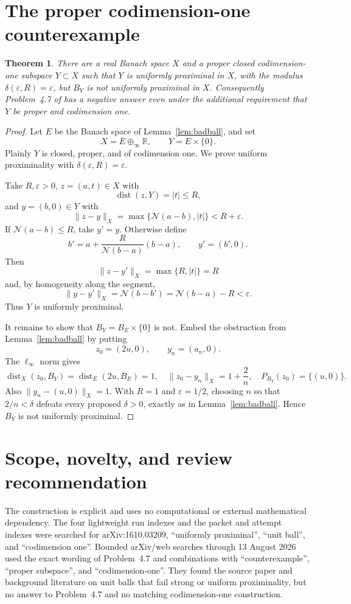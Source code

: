 \documentclass[11pt,a4paper]{article}
\newtheorem{theorem}{Theorem}
\newcommand{\R}{\mathbb R}
\newcommand{\N}{\mathcal N}
\newcommand{\dist}{\operatorname{dist}}
\begin{document}
\section{The proper codimension-one counterexample}

\begin{theorem}\label{thm:main}
There are a real Banach space $X$ and a proper closed codimension-one subspace
$Y\subset X$ such that $Y$ is uniformly proximinal in $X$, with the modulus
$\delta(\varepsilon,R)=\varepsilon$, but $B_Y$ is not uniformly proximinal
in $X$. Consequently Problem~4.7 of \cite{Paul} has a negative answer even
under the additional requirement that $Y$ be proper and codimension one.
\end{theorem}

\begin{proof}
Let $E$ be the Banach space of Lemma~\ref{lem:badball}, and set
\[
 X=E\oplus_\infty\R,
 \qquad Y=E\times\{0\}.
\]
Plainly $Y$ is closed, proper, and of codimension one. We prove uniform
proximinality with $\delta(\varepsilon,R)=\varepsilon$.

Take $R,\varepsilon>0$, $z=(a,t)\in X$ with
\[
 \dist(z,Y)=|t|\le R,
\]
and $y=(b,0)\in Y$ with
\[
 \|z-y\|_X=\max\{\N(a-b),|t|\}<R+\varepsilon.
\]
If $\N(a-b)\le R$, take $y'=y$. Otherwise define
\[
 b'=a+\frac{R}{\N(b-a)}(b-a),
 \qquad y'=(b',0).
\]
Then
\[
 \|z-y'\|_X=\max\{R,|t|\}=R
\]
and, by homogeneity along the segment,
\[
 \|y-y'\|_X=\N(b-b')=\N(b-a)-R<\varepsilon.
\]
Thus $Y$ is uniformly proximinal.

It remains to show that $B_Y=B_E\times\{0\}$ is not. Embed the obstruction
from Lemma~\ref{lem:badball} by putting
\[
 z_0=(2u,0),\qquad y_n=(a_n,0).
\]
The $\ell_\infty$ norm gives
\[
 \dist_X(z_0,B_Y)=\dist_E(2u,B_E)=1,
 \quad \|z_0-y_n\|_X=1+\frac2n,
 \quad P_{B_Y}(z_0)=\{(u,0)\}.
\]
Also $\|y_n-(u,0)\|_X=1$. With $R=1$ and
$\varepsilon=1/2$, choosing $n$ so that $2/n<\delta$ defeats every proposed
$\delta>0$, exactly as in Lemma~\ref{lem:badball}. Hence $B_Y$ is not
uniformly proximinal.
\end{proof}

\section{Scope, novelty, and review recommendation}

The construction is explicit and uses no computational or external
mathematical dependency. The four lightweight run indexes and the packet and
attempt indexes were searched for arXiv:1610.03209, ``uniformly proximinal'',
``unit ball'', and ``codimension one''. Bounded arXiv/web searches through
13 August 2026 used the exact wording of Problem~4.7 and combinations with
``counterexample'', ``proper subspace'', and ``codimension-one''. They found
the source paper and background literature on unit balls that fail strong or
uniform proximinality, but no answer to Problem~4.7 and no matching
codimension-one construction.
\end{document}
